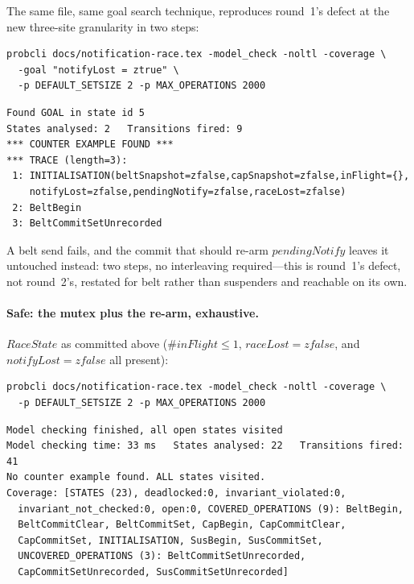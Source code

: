 \documentclass[a4paper,10pt,fleqn]{article}
\begin{document}
The same file, same goal search technique, reproduces round~1's defect
at the new three-site granularity in two steps:

\begin{verbatim}
probcli docs/notification-race.tex -model_check -noltl -coverage \
  -goal "notifyLost = ztrue" \
  -p DEFAULT_SETSIZE 2 -p MAX_OPERATIONS 2000
\end{verbatim}

\begin{verbatim}
Found GOAL in state id 5
States analysed: 2   Transitions fired: 9
*** COUNTER EXAMPLE FOUND ***
*** TRACE (length=3):
 1: INITIALISATION(beltSnapshot=zfalse,capSnapshot=zfalse,inFlight={},
    notifyLost=zfalse,pendingNotify=zfalse,raceLost=zfalse)
 2: BeltBegin
 3: BeltCommitSetUnrecorded
\end{verbatim}

A belt send fails, and the commit that should re-arm $pendingNotify$
leaves it untouched instead: two steps, no interleaving required---this
is round~1's defect, not round~2's, restated for belt rather than
suspenders and reachable on its own.

\paragraph{Safe: the mutex plus the re-arm, exhaustive.}  $RaceState$ as
committed above ($\# inFlight \leq 1$, $raceLost = zfalse$, and
$notifyLost = zfalse$ all present):

\begin{verbatim}
probcli docs/notification-race.tex -model_check -noltl -coverage \
  -p DEFAULT_SETSIZE 2 -p MAX_OPERATIONS 2000
\end{verbatim}

\begin{verbatim}
Model checking finished, all open states visited
Model checking time: 33 ms   States analysed: 22   Transitions fired: 41
No counter example found. ALL states visited.
Coverage: [STATES (23), deadlocked:0, invariant_violated:0,
  invariant_not_checked:0, open:0, COVERED_OPERATIONS (9): BeltBegin,
  BeltCommitClear, BeltCommitSet, CapBegin, CapCommitClear,
  CapCommitSet, INITIALISATION, SusBegin, SusCommitSet,
  UNCOVERED_OPERATIONS (3): BeltCommitSetUnrecorded,
  CapCommitSetUnrecorded, SusCommitSetUnrecorded]
\end{verbatim}
\end{document}

